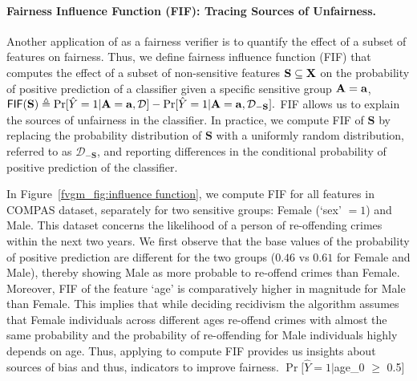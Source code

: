 \paragraph{Fairness Influence Function (FIF): Tracing Sources of Unfairness.}
Another application of \fvgm{} as a fairness verifier is to quantify the effect of a subset of features on fairness. Thus, we define fairness influence function (FIF)  that computes the effect of a subset of non-sensitive features $\mathbf{S} \subseteq \mathbf{X}$ on the probability of positive prediction of a classifier given a specific sensitive group $ \mathbf{A} = \mathbf{a}$,
$
	\mathsf{FIF}(\mathbf{S}) \triangleq \Pr[\hat{Y} = 1 | \mathbf{A} = \mathbf{a}, \mathcal{D}] - \Pr[\hat{Y} = 1 | \mathbf{A} = \mathbf{a},  \mathcal{D}_{-\mathbf{S}}].
$
FIF allows us to explain the sources of unfairness in the classifier. In practice, we compute FIF of $\mathbf{S}$ by replacing the probability distribution of $\mathbf{S}$ with a uniformly random distribution, referred to as  $ \mathcal{D}_{-\mathbf{S}} $, and reporting differences in the conditional probability of positive prediction of the classifier. 

In Figure~\ref{fvgm_fig:influence function}, we compute FIF for all features in COMPAS dataset, separately for two sensitive groups: Female (`sex' $ = 1 $) and Male. This dataset concerns the likelihood of a person of re-offending crimes within the next two years. We first observe that the base values of the probability of positive prediction are different for the two groups ($ 0.46 $ vs $ 0.61 $ for Female and Male), thereby showing Male as more probable to re-offend crimes than Female. Moreover, FIF of the feature `age' is comparatively higher in magnitude for Male than Female. 
This implies that while deciding recidivism the algorithm assumes that Female individuals across different ages re-offend crimes with almost the same probability and the probability of re-offending for Male individuals highly depends on age. Thus, applying {\fvgm} to compute FIF provides us insights about sources of bias and thus, indicators to improve fairness.
$\Pr[\hat{Y} = 1|$age\_0 $\ge$ 0.5]

